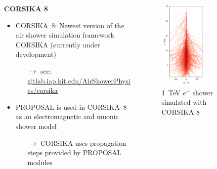 \begin{frame}[c]
    \begin{columns}[onlytextwidth]
    \begin{column}{0.6\textwidth}
    \textbf{CORSIKA 8}
        \begin{itemize}
            \item CORSIKA~8: Newest version of the air shower simulation framework CORSIKA (currently under development)
            \begin{itemize}
                \item[$\rightarrow$] see: \url{gitlab.iap.kit.edu/AirShowerPhysics/corsika}
            \end{itemize}
            \item PROPOSAL is used in CORSIKA~8 as an electromagnetic and muonic shower model
            \begin{itemize}
                \item[$\rightarrow$] CORSIKA uses propagation steps provided by PROPOSAL modules
            \end{itemize}
        \end{itemize}

    \end{column}
        \begin{column}{0.4\textwidth}
            \begin{figure}
                \centering
                \includegraphics[width=0.6\textwidth]{plots/shower.png}
                \caption*{\SI{1}{\tera\electronvolt} $e^-$ shower simulated with CORSIKA 8}
            \end{figure}
        \end{column}
    \end{columns}
\end{frame}


